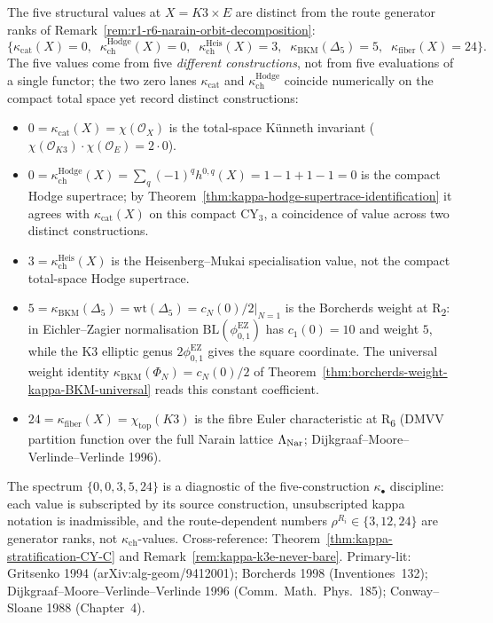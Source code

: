 \begin{remark}
\label{rem:four-kappa-spectrum-0-3-5-24}
The five structural values at \(X = K3 \times E\) are distinct from the route generator ranks of Remark~\ref{rem:r1-r6-narain-orbit-decomposition}:
\[
 \{\kappa_{\mathrm{cat}}(X) = 0,\;\; \kappa_{\mathrm{ch}}^{\mathrm{Hodge}}(X) = 0,\;\; \kappa_{\mathrm{ch}}^{\mathrm{Heis}}(X) = 3,\;\; \kappa_{\mathrm{BKM}}(\Delta_5) = 5,\;\; \kappa_{\mathrm{fiber}}(X) = 24\}.
\]
The five values come from five \emph{different constructions}, not from five evaluations of a single functor; the two zero lanes $\kappa_{\mathrm{cat}}$ and $\kappa_{\mathrm{ch}}^{\mathrm{Hodge}}$ coincide numerically on the compact total space yet record distinct constructions:
\begin{itemize}
 \item $0 = \kappa_{\mathrm{cat}}(X)=\chi(\mathcal O_X)$ is the total-space K\"unneth invariant ($\chi(\mathcal O_{K3})\cdot\chi(\mathcal O_E) = 2\cdot 0$).
 \item $0 = \kappa_{\mathrm{ch}}^{\mathrm{Hodge}}(X)=\sum_q(-1)^q h^{0,q}(X)=1-1+1-1=0$ is the compact Hodge supertrace; by Theorem~\ref{thm:kappa-hodge-supertrace-identification} it agrees with $\kappa_{\mathrm{cat}}(X)$ on this compact CY$_3$, a coincidence of value across two distinct constructions.
 \item $3 = \kappa_{\mathrm{ch}}^{\mathrm{Heis}}(X)$ is the Heisenberg--Mukai specialisation value, not the compact total-space Hodge supertrace.
 \item $5 = \kappa_{\mathrm{BKM}}(\Delta_5) = \mathrm{wt}(\Delta_5) = \left.c_N(0)/2\right|_{N=1}$ is the Borcherds weight at R\textsubscript{2}: in Eichler--Zagier normalisation \(\mathrm{BL}(\phi_{0,1}^{\mathrm{EZ}})\) has \(c_1(0)=10\) and weight \(5\), while the K3 elliptic genus \(2\phi_{0,1}^{\mathrm{EZ}}\) gives the square coordinate. The universal weight identity $\kappa_{\mathrm{BKM}}(\Phi_N) = c_N(0)/2$ of Theorem~\ref{thm:borcherds-weight-kappa-BKM-universal} reads this constant coefficient.
 \item $24 = \kappa_{\mathrm{fiber}}(X) = \chi_{\mathrm{top}}(K3)$ is the fibre Euler characteristic at R\textsubscript{6} (DMVV partition function over the full Narain lattice $\Lambda_{\mathrm{Nar}}$; Dijkgraaf--Moore--Verlinde--Verlinde 1996).
\end{itemize}
The spectrum $\{0, 0, 3, 5, 24\}$ is a diagnostic of the five-construction $\kappa_\bullet$ discipline: each value is subscripted by its source construction, unsubscripted kappa notation is inadmissible, and the route-dependent numbers $\rho^{R_i}\in\{3,12,24\}$ are generator ranks, not $\kappa_{\mathrm{ch}}$-values. Cross-reference: Theorem~\ref{thm:kappa-stratification-CY-C} and Remark~\ref{rem:kappa-k3e-never-bare}. Primary-lit: Gritsenko 1994 (arXiv:alg-geom/9412001); Borcherds 1998 (Inventiones~132); Dijkgraaf--Moore--Verlinde--Verlinde 1996 (Comm.~Math.~Phys.~185); Conway--Sloane 1988 (Chapter~4).
\end{remark}

